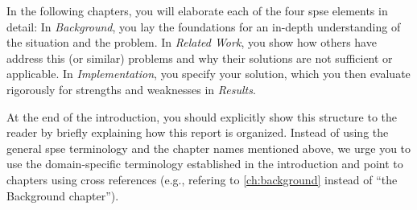 In the following chapters, you will elaborate each of the four \gls{spse} elements in detail:
In \textsl{Background}, you lay the foundations for an in-depth understanding of the situation and the problem.
In \textsl{Related Work}, you show how others have address this (or similar) problems and why their solutions are not sufficient or applicable.
In \textsl{Implementation}, you specify your solution, which you then evaluate rigorously for strengths and weaknesses in \textsl{Results}.

At the end of the introduction, you should explicitly show this structure to the reader by briefly explaining how this report is organized.
Instead of using the general \gls{spse} terminology and the chapter names mentioned above, we urge you to use the domain-specific terminology established in the introduction and point to chapters using cross references (e.g., refering to \cref{ch:background} instead of ``the Background chapter'').
